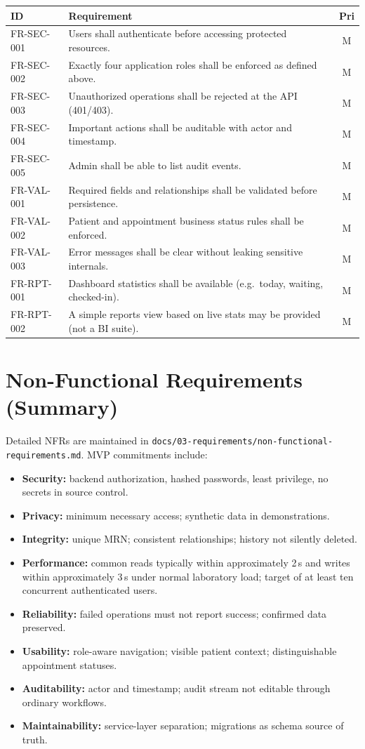 \documentclass[11pt,a4paper]{article}
\begin{document}
\begin{longtable}{@{}p{2.2cm}p{11.2cm}c@{}}
\toprule
\textbf{ID} & \textbf{Requirement} & \textbf{Pri} \\
\midrule
\endhead
FR-SEC-001 & Users shall authenticate before accessing protected resources. & M \\
FR-SEC-002 & Exactly four application roles shall be enforced as defined above. & M \\
FR-SEC-003 & Unauthorized operations shall be rejected at the API (401/403). & M \\
FR-SEC-004 & Important actions shall be auditable with actor and timestamp. & M \\
FR-SEC-005 & Admin shall be able to list audit events. & M \\
FR-VAL-001 & Required fields and relationships shall be validated before persistence. & M \\
FR-VAL-002 & Patient and appointment business status rules shall be enforced. & M \\
FR-VAL-003 & Error messages shall be clear without leaking sensitive internals. & M \\
FR-RPT-001 & Dashboard statistics shall be available (e.g.\ today, waiting, checked-in). & M \\
FR-RPT-002 & A simple reports view based on live stats may be provided (not a BI suite). & M \\
\bottomrule
\end{longtable}

\section{Non-Functional Requirements (Summary)}

Detailed NFRs are maintained in \texttt{docs/03-requirements/non-functional-requirements.md}. MVP commitments include:

\begin{itemize}
  \item \textbf{Security:} backend authorization, hashed passwords, least privilege, no secrets in source control.
  \item \textbf{Privacy:} minimum necessary access; synthetic data in demonstrations.
  \item \textbf{Integrity:} unique MRN; consistent relationships; history not silently deleted.
  \item \textbf{Performance:} common reads typically within approximately 2\,s and writes within approximately 3\,s under normal laboratory load; target of at least ten concurrent authenticated users.
  \item \textbf{Reliability:} failed operations must not report success; confirmed data preserved.
  \item \textbf{Usability:} role-aware navigation; visible patient context; distinguishable appointment statuses.
  \item \textbf{Auditability:} actor and timestamp; audit stream not editable through ordinary workflows.
  \item \textbf{Maintainability:} service-layer separation; migrations as schema source of truth.
\end{itemize}
\end{document}
